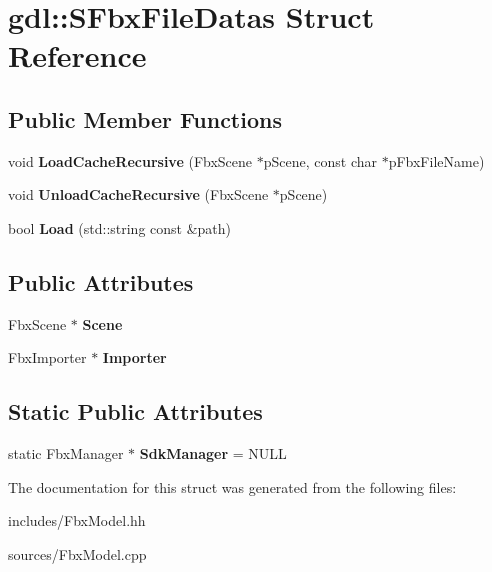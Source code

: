 \hypertarget{structgdl_1_1_s_fbx_file_datas}{\section{gdl\-:\-:S\-Fbx\-File\-Datas Struct Reference}
\label{structgdl_1_1_s_fbx_file_datas}
}
\subsection*{Public Member Functions}
\begin{DoxyCompactItemize}
\item 
\hypertarget{structgdl_1_1_s_fbx_file_datas_a0c59ffea79c83f50be22ae54255c97b9}{void {\bfseries Load\-Cache\-Recursive} (Fbx\-Scene $\ast$p\-Scene, const char $\ast$p\-Fbx\-File\-Name)}\label{structgdl_1_1_s_fbx_file_datas_a0c59ffea79c83f50be22ae54255c97b9}

\item 
\hypertarget{structgdl_1_1_s_fbx_file_datas_aa07d56f0cafe231843fb485d0d0617d6}{void {\bfseries Unload\-Cache\-Recursive} (Fbx\-Scene $\ast$p\-Scene)}\label{structgdl_1_1_s_fbx_file_datas_aa07d56f0cafe231843fb485d0d0617d6}

\item 
\hypertarget{structgdl_1_1_s_fbx_file_datas_aff6e9cf3f70dcf7a787d0c8fa70e4a2a}{bool {\bfseries Load} (std\-::string const \&path)}\label{structgdl_1_1_s_fbx_file_datas_aff6e9cf3f70dcf7a787d0c8fa70e4a2a}

\end{DoxyCompactItemize}
\subsection*{Public Attributes}
\begin{DoxyCompactItemize}
\item 
\hypertarget{structgdl_1_1_s_fbx_file_datas_a30420be308e26463680a8bf8e5a483fb}{Fbx\-Scene $\ast$ {\bfseries Scene}}\label{structgdl_1_1_s_fbx_file_datas_a30420be308e26463680a8bf8e5a483fb}

\item 
\hypertarget{structgdl_1_1_s_fbx_file_datas_acecda5a3bea9a61b17e13d733481515a}{Fbx\-Importer $\ast$ {\bfseries Importer}}\label{structgdl_1_1_s_fbx_file_datas_acecda5a3bea9a61b17e13d733481515a}

\end{DoxyCompactItemize}
\subsection*{Static Public Attributes}
\begin{DoxyCompactItemize}
\item 
\hypertarget{structgdl_1_1_s_fbx_file_datas_ac2204869ad883ea98673332d60a4676c}{static Fbx\-Manager $\ast$ {\bfseries Sdk\-Manager} = N\-U\-L\-L}\label{structgdl_1_1_s_fbx_file_datas_ac2204869ad883ea98673332d60a4676c}

\end{DoxyCompactItemize}


The documentation for this struct was generated from the following files\-:\begin{DoxyCompactItemize}
\item 
includes/Fbx\-Model.\-hh\item 
sources/Fbx\-Model.\-cpp\end{DoxyCompactItemize}
